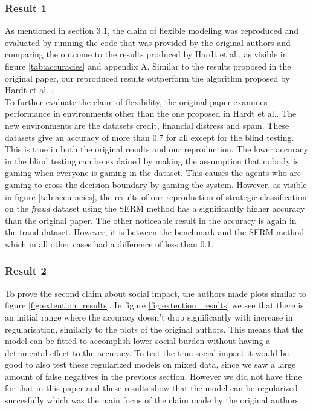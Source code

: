 \subsubsection{Result 1}
As mentioned in section 3.1, the claim of flexible modeling was reproduced and evaluated by running the code that was provided by the original authors and comparing the outcome to the results produced by Hardt et al.\cite{hardt2016strategic}, as visible in figure \ref{tab:accuracies} and appendix A. Similar to the results proposed in the original paper, our reproduced results outperform the algorithm proposed by Hardt et al. \cite{hardt2016strategic}.\\
To further evaluate the claim of flexibility, the original paper examines performance in environments other than the one proposed in Hardt et al.\cite{hardt2016strategic}. The new environments are the datasets credit, financial distress and spam. These datasets give an accuracy of more than 0.7 for all except for the blind testing. This is true in both the original results and our reproduction. The lower accuracy in the blind testing can be explained by making the assumption that nobody is gaming when everyone is gaming in the dataset. This causes the agents who are gaming to cross the decision boundary by gaming the system. However, as visible in figure \ref{tab:accuracies}, the results of our reproduction of strategic classification on the \textit{fraud} dataset using the SERM method has a significantly higher accuracy than the original paper. The other noticeable result in the accuracy is again in the fraud dataset. However, it is between the benchmark and the SERM method which in all other cases had a difference of less than 0.1. 

\subsubsection{Result 2}
To prove the second claim about social impact, the authors made plots similar to figure \ref{fig:extention_results}. In figure \ref{fig:extention_results} we see that there is an initial range where the accuracy doesn't drop significantly with increase in regularisation, similarly to the plots of the original authors. This means that the model can be fitted to accomplish lower social burden without having a detrimental effect to the accuracy. To test the true social impact it would be good to also test these regularized models on mixed data, since we saw a large amount of false negatives in the previous section. However we did not have time for that in this paper and these results show that the model can be regularized succesfully which was the main focus of the claim made by the original authors.

